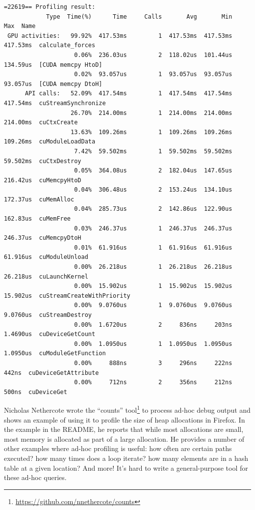 \documentclass[a4paper]{report}
\begin{document}
{\scriptsize
\begin{verbatim}
=22619== Profiling result:
            Type  Time(%)      Time     Calls       Avg       Min       Max  Name
 GPU activities:   99.92%  417.53ms         1  417.53ms  417.53ms  417.53ms  calculate_forces
                    0.06%  236.03us         2  118.02us  101.44us  134.59us  [CUDA memcpy HtoD]
                    0.02%  93.057us         1  93.057us  93.057us  93.057us  [CUDA memcpy DtoH]
      API calls:   52.09%  417.54ms         1  417.54ms  417.54ms  417.54ms  cuStreamSynchronize
                   26.70%  214.00ms         1  214.00ms  214.00ms  214.00ms  cuCtxCreate
                   13.63%  109.26ms         1  109.26ms  109.26ms  109.26ms  cuModuleLoadData
                    7.42%  59.502ms         1  59.502ms  59.502ms  59.502ms  cuCtxDestroy
                    0.05%  364.08us         2  182.04us  147.65us  216.42us  cuMemcpyHtoD
                    0.04%  306.48us         2  153.24us  134.10us  172.37us  cuMemAlloc
                    0.04%  285.73us         2  142.86us  122.90us  162.83us  cuMemFree
                    0.03%  246.37us         1  246.37us  246.37us  246.37us  cuMemcpyDtoH
                    0.01%  61.916us         1  61.916us  61.916us  61.916us  cuModuleUnload
                    0.00%  26.218us         1  26.218us  26.218us  26.218us  cuLaunchKernel
                    0.00%  15.902us         1  15.902us  15.902us  15.902us  cuStreamCreateWithPriority
                    0.00%  9.0760us         1  9.0760us  9.0760us  9.0760us  cuStreamDestroy
                    0.00%  1.6720us         2     836ns     203ns  1.4690us  cuDeviceGetCount
                    0.00%  1.0950us         1  1.0950us  1.0950us  1.0950us  cuModuleGetFunction
                    0.00%     888ns         3     296ns     222ns     442ns  cuDeviceGetAttribute
                    0.00%     712ns         2     356ns     212ns     500ns  cuDeviceGet
\end{verbatim}
}


Nicholas Nethercote wrote the ``counts'' tool\footnote{\url{https://github.com/nnethercote/counts}} to process ad-hoc debug output and shows an example of using it to profile the size of heap allocations in Firefox. In the example in the README, he reports that while most allocations are small, most memory is allocated as part of a large allocation. He provides a number of other examples where ad-hoc profiling is useful: how often are certain paths executed? how many times does a loop iterate? how many elements are in a hash table at a given location? And more! It's hard to write a general-purpose tool for these ad-hoc queries.
\end{document}
